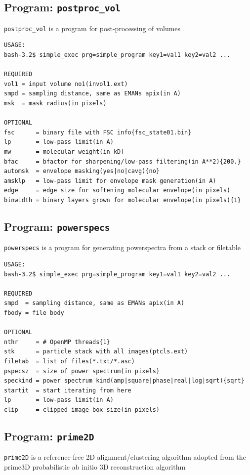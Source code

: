 \documentclass[a4paper,11pt]{article}
\newcommand{\prgname}[1]{\textcolor{NavyBlue}{\texttt{#1}}}
\begin{document}
\subsection{Program: \prgname{postproc\_vol}}
\label{postproc_vol}
\prgname{postproc\_vol} is a program for post-processing of volumes

\begin{verbatim}
USAGE:
bash-3.2$ simple_exec prg=simple_program key1=val1 key2=val2 ...

REQUIRED
vol1 = input volume no1(invol1.ext)
smpd = sampling distance, same as EMANs apix(in A)
msk  = mask radius(in pixels)

OPTIONAL
fsc      = binary file with FSC info{fsc_state01.bin}
lp       = low-pass limit(in A)
mw       = molecular weight(in kD)
bfac     = bfactor for sharpening/low-pass filtering(in A**2){200.}
automsk  = envelope masking(yes|no|cavg){no}
amsklp   = low-pass limit for envelope mask generation(in A)
edge     = edge size for softening molecular envelope(in pixels)
binwidth = binary layers grown for molecular envelope(in pixels){1}
\end{verbatim}

\subsection{Program: \prgname{powerspecs}}
\label{powerspecs}
\prgname{powerspecs} is a program for generating powerspectra from a stack or filetable

\begin{verbatim}
USAGE:
bash-3.2$ simple_exec prg=simple_program key1=val1 key2=val2 ...

REQUIRED
smpd  = sampling distance, same as EMANs apix(in A)
fbody = file body

OPTIONAL
nthr     = # OpenMP threads{1}
stk      = particle stack with all images(ptcls.ext)
filetab  = list of files(*.txt/*.asc)
pspecsz  = size of power spectrum(in pixels)
speckind = power spectrum kind(amp|square|phase|real|log|sqrt){sqrt}
startit  = start iterating from here
lp       = low-pass limit(in A)
clip     = clipped image box size(in pixels)
\end{verbatim}

\subsection{Program: \prgname{prime2D}}
\label{prime2D}
\prgname{prime2D} is a reference-free 2D alignment/clustering algorithm adopted from the prime3D probabilistic ab initio 3D reconstruction algorithm
\end{document}
